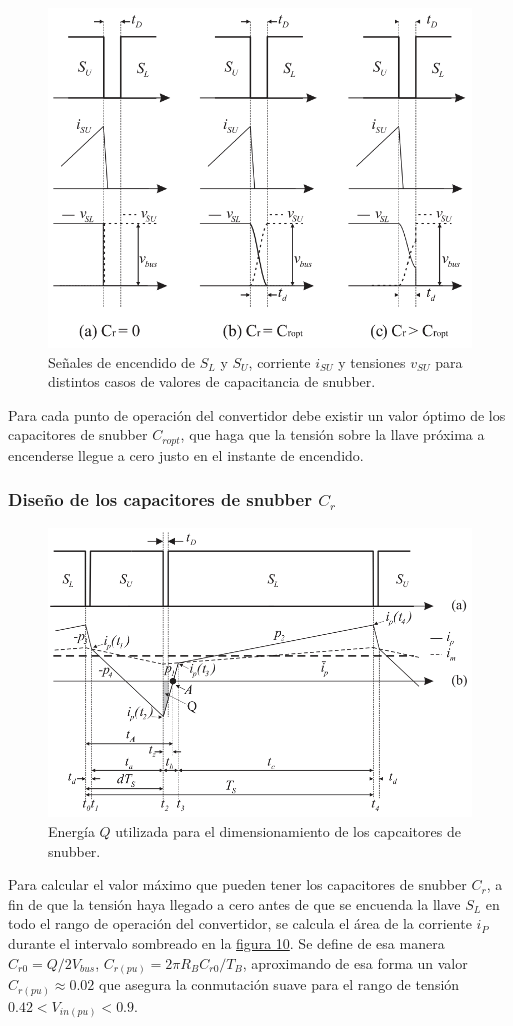 \begin{figure}
	\centering
	\includegraphics[width=0.6\linewidth]{img/capSnubber}
	\caption{Señales de encendido de $S_L$ y $S_U$, corriente $i_{SU}$ y tensiones $v_{SU}$ para distintos casos de valores de capacitancia de snubber.}
	\label{fig:capsnubber}
\end{figure}

Para cada punto de operación del convertidor debe existir un valor óptimo de los capacitores de snubber $C_{ropt}$, que haga que la tensión sobre la llave próxima a encenderse llegue a cero justo en el instante de encendido.

\subsubsection{Diseño de los capacitores de snubber $C_r$}

\begin{figure}
	\centering
	\includegraphics[width=0.6\linewidth]{img/energiaQ}
	\caption{Energía $Q$ utilizada para el dimensionamiento de los capcaitores de snubber.}
	\label{fig:energiaq}
\end{figure}

Para calcular el valor máximo que pueden tener los capacitores de snubber $C_r$, a fin de que la tensión haya llegado a cero antes de que se encuenda la llave $S_L$ en todo el rango de operación del convertidor, se calcula el área de la corriente $i_P$ durante el intervalo sombreado en la \hyperref[fig:energiaq]{figura 10}. Se define de esa manera $C_{r0}=Q/2V_{bus}$, $C_{r(pu)}=2\pi R_B C_{r0}/T_B$, aproximando de esa forma un valor $C_{r(pu)} \approx 0.02$ que asegura la conmutación suave para el rango de tensión $0.42 < V_{in(pu)} < 0.9$.


